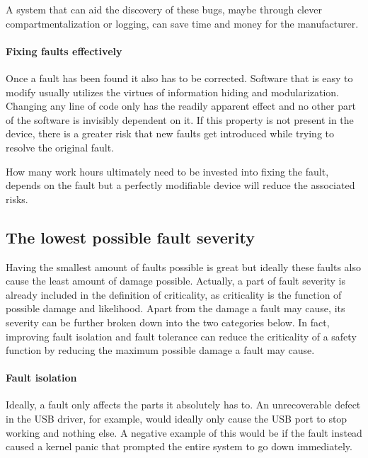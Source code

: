 A system that can aid the discovery of these bugs, maybe through clever compartmentalization or logging, can save time and money for the manufacturer.
\paragraph{Fixing faults effectively}
Once a fault has been found it also has to be corrected. Software that is easy to modify usually utilizes the virtues of information hiding and modularization. Changing any line of code only has the readily apparent effect and no other part of the software is invisibly dependent on it. If this property is not present in the device, there is a greater risk that new faults get introduced while trying to resolve the original fault. 

How many work hours ultimately need to be invested into fixing the fault, depends on the fault but a perfectly modifiable device will reduce the associated risks.
\subsection{The lowest possible fault severity}
Having the smallest amount of faults possible is great but ideally these faults also cause the least amount of damage possible. Actually, a part of fault severity is already included in the definition of criticality, as criticality is the function of possible damage and likelihood. Apart from the damage a fault may cause, its severity can be further broken down into the two categories below. In fact, improving fault isolation and fault tolerance can reduce the criticality of a safety function by reducing the maximum possible damage a fault may cause.

\paragraph{Fault isolation}
Ideally,  a fault only affects the parts it absolutely has to. An unrecoverable defect in the USB driver, for example, would ideally only cause the USB port to stop working and nothing else. A negative example of this would be if the fault instead caused a kernel panic that prompted the entire system to go down immediately.
